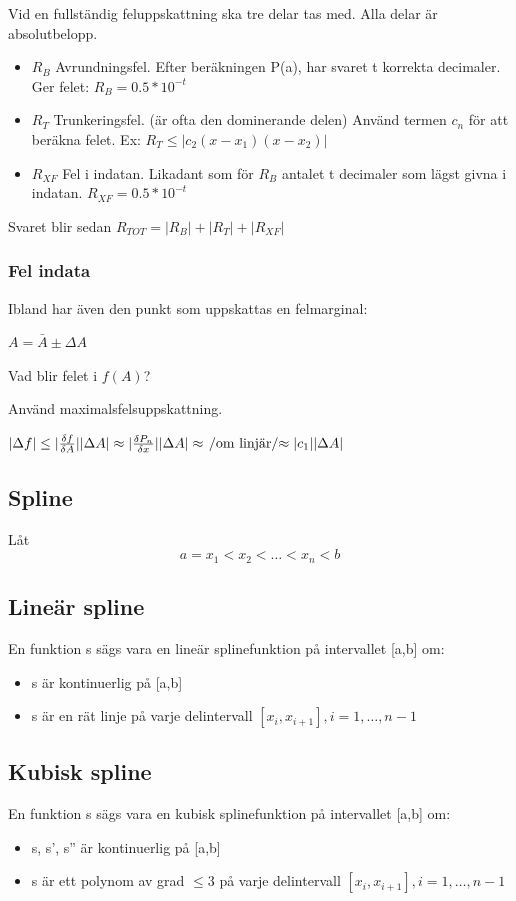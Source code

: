 \documentclass[12pt,a4paper]{article}
\begin{document}
Vid en fullständig feluppskattning ska tre delar tas med.
Alla delar är absolutbelopp.

\begin{itemize}
\item{$R_B$ Avrundningsfel.
Efter beräkningen P(a), har svaret t korrekta decimaler. \\Ger felet: $ R_B = 0.5 * 10^{-t}$}
\item{$R_T$ Trunkeringsfel.
(är ofta den dominerande delen)
Använd termen $c_n$ för att beräkna felet.
Ex: $ R_T \leq |c_2 (x-x_1)(x-x_2)|$
}
\item{$R_{XF}$ Fel i indatan.
Likadant som för $R_B$ antalet t decimaler som lägst givna i indatan.
$R_{XF} = 0.5 * 10^{-t}$}
\end{itemize}

Svaret blir sedan $R_{TOT} = | R_B | + | R_T | + |R_{XF}| $

\subsubsection{Fel indata}
Ibland har även den punkt som uppskattas en felmarginal:

$A = \bar{A} \pm \Delta A $

Vad blir felet i $f(A)$?

Använd maximalsfelsuppskattning.

$|\Delta f| \leq |\frac{\delta f}{\delta A}| |\Delta A| \approx |\frac{\delta P_n}{\delta x}| |\Delta A| \approx \left. \middle/ \text{om linjär} \middle/ \approx \right. |c_1||\Delta A|$


\subsection{Spline}
Låt
$$ a = x_1 < x_2 < \ldots < x_n < b $$

\subsection{Lineär spline}
En funktion s sägs vara en lineär splinefunktion på intervallet [a,b] om:
\begin{itemize}
\item{s är kontinuerlig på [a,b]}
\item{s är en rät linje på varje delintervall $[x_i,x_{i+1}], i = 1,\ldots,n-1 $}
\end{itemize}

\subsection{Kubisk spline}
En funktion s sägs vara en kubisk splinefunktion på intervallet [a,b] om:
\begin{itemize}
\item{s, s', s'' är kontinuerlig på [a,b]}
\item{s är ett polynom av grad $\leq 3$ på varje delintervall $[x_i,x_{i+1}], i = 1,\ldots,n-1 $}
\end{itemize}
\end{document}
